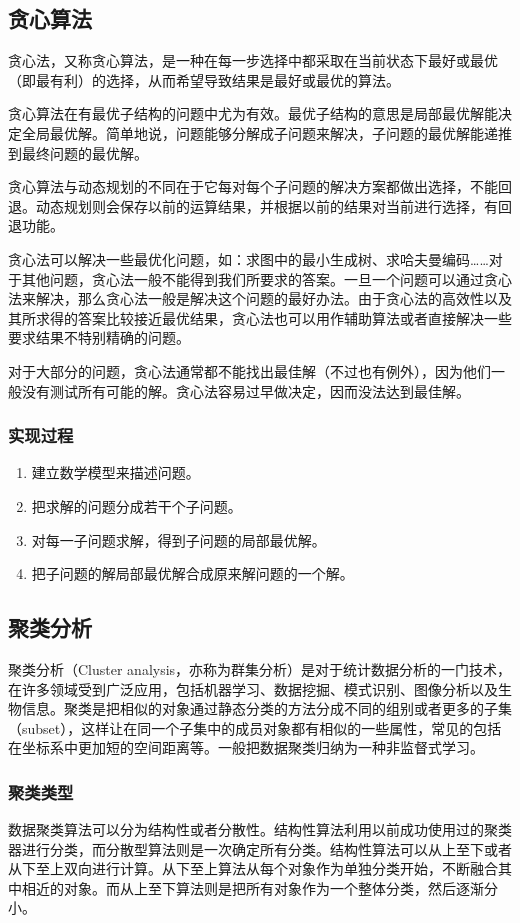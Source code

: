\documentclass[11pt,a4paper,twoside]{book}
\begin{document}
\subsection{贪心算法}
贪心法，又称贪心算法，是一种在每一步选择中都采取在当前状态下最好或最优（即最有利）的选择，从而希望导致结果是最好或最优的算法。

贪心算法在有最优子结构的问题中尤为有效。最优子结构的意思是局部最优解能决定全局最优解。简单地说，问题能够分解成子问题来解决，子问题的最优解能递推到最终问题的最优解。

贪心算法与动态规划的不同在于它每对每个子问题的解决方案都做出选择，不能回退。动态规划则会保存以前的运算结果，并根据以前的结果对当前进行选择，有回退功能。

贪心法可以解决一些最优化问题，如：求图中的最小生成树、求哈夫曼编码……对于其他问题，贪心法一般不能得到我们所要求的答案。一旦一个问题可以通过贪心法来解决，那么贪心法一般是解决这个问题的最好办法。由于贪心法的高效性以及其所求得的答案比较接近最优结果，贪心法也可以用作辅助算法或者直接解决一些要求结果不特别精确的问题。

对于大部分的问题，贪心法通常都不能找出最佳解（不过也有例外），因为他们一般没有测试所有可能的解。贪心法容易过早做决定，因而没法达到最佳解。
\subsubsection{实现过程}
\begin{enumerate}
  \item 建立数学模型来描述问题。
  \item 把求解的问题分成若干个子问题。
  \item 对每一子问题求解，得到子问题的局部最优解。
  \item 把子问题的解局部最优解合成原来解问题的一个解。
\end{enumerate}

\subsection{聚类分析}
聚类分析（Cluster analysis，亦称为群集分析）是对于统计数据分析的一门技术，在许多领域受到广泛应用，包括机器学习、数据挖掘、模式识别、图像分析以及生物信息。聚类是把相似的对象通过静态分类的方法分成不同的组别或者更多的子集（subset），这样让在同一个子集中的成员对象都有相似的一些属性，常见的包括在坐标系中更加短的空间距离等。一般把数据聚类归纳为一种非监督式学习。
\subsubsection{聚类类型}
数据聚类算法可以分为结构性或者分散性。结构性算法利用以前成功使用过的聚类器进行分类，而分散型算法则是一次确定所有分类。结构性算法可以从上至下或者从下至上双向进行计算。从下至上算法从每个对象作为单独分类开始，不断融合其中相近的对象。而从上至下算法则是把所有对象作为一个整体分类，然后逐渐分小。
\end{document}
